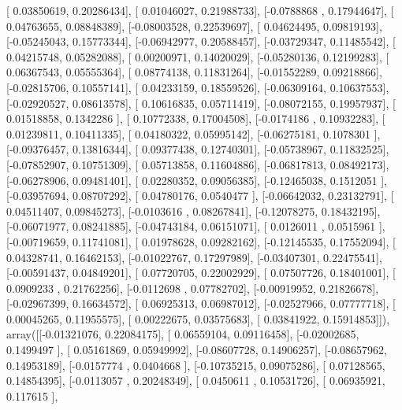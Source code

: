 \documentclass{article}
\begin{document}
       [ 0.03850619,  0.20286434],
       [ 0.01046027,  0.21988733],
       [-0.0788868 ,  0.17944647],
       [ 0.04763655,  0.08848389],
       [-0.08003528,  0.22539697],
       [ 0.04624495,  0.09819193],
       [-0.05245043,  0.15773344],
       [-0.06942977,  0.20588457],
       [-0.03729347,  0.11485542],
       [ 0.04215748,  0.05282088],
       [ 0.00200971,  0.14020029],
       [-0.05280136,  0.12199283],
       [ 0.06367543,  0.05555364],
       [ 0.08774138,  0.11831264],
       [-0.01552289,  0.09218866],
       [-0.02815706,  0.10557141],
       [ 0.04233159,  0.18559526],
       [-0.06309164,  0.10637553],
       [-0.02920527,  0.08613578],
       [ 0.10616835,  0.05711419],
       [-0.08072155,  0.19957937],
       [ 0.01518858,  0.1342286 ],
       [ 0.10772338,  0.17004508],
       [-0.0174186 ,  0.10932283],
       [ 0.01239811,  0.10411335],
       [ 0.04180322,  0.05995142],
       [-0.06275181,  0.1078301 ],
       [-0.09376457,  0.13816344],
       [ 0.09377438,  0.12740301],
       [-0.05738967,  0.11832525],
       [-0.07852907,  0.10751309],
       [ 0.05713858,  0.11604886],
       [-0.06817813,  0.08492173],
       [-0.06278906,  0.09481401],
       [ 0.02280352,  0.09056385],
       [-0.12465038,  0.1512051 ],
       [-0.03957694,  0.08707292],
       [ 0.04780176,  0.0540477 ],
       [-0.06642032,  0.23132791],
       [ 0.04511407,  0.09845273],
       [-0.0103616 ,  0.08267841],
       [-0.12078275,  0.18432195],
       [-0.06071977,  0.08241885],
       [-0.04743184,  0.06151071],
       [ 0.0126011 ,  0.0515961 ],
       [-0.00719659,  0.11741081],
       [ 0.01978628,  0.09282162],
       [-0.12145535,  0.17552094],
       [ 0.04328741,  0.16462153],
       [-0.01022767,  0.17297989],
       [-0.03407301,  0.22475541],
       [-0.00591437,  0.04849201],
       [ 0.07720705,  0.22002929],
       [ 0.07507726,  0.18401001],
       [ 0.0909233 ,  0.21762256],
       [-0.0112698 ,  0.07782702],
       [-0.00919952,  0.21826678],
       [-0.02967399,  0.16634572],
       [ 0.06925313,  0.06987012],
       [-0.02527966,  0.07777718],
       [ 0.00045265,  0.11955575],
       [ 0.00222675,  0.03575683],
       [ 0.03841922,  0.15914853]]), array([[-0.01321076,  0.22084175],
       [ 0.06559104,  0.09116458],
       [-0.02002685,  0.1499497 ],
       [ 0.05161869,  0.05949992],
       [-0.08607728,  0.14906257],
       [-0.08657962,  0.14953189],
       [-0.0157774 ,  0.0404668 ],
       [-0.10735215,  0.09075286],
       [ 0.07128565,  0.14854395],
       [-0.0113057 ,  0.20248349],
       [ 0.0450611 ,  0.10531726],
       [ 0.06935921,  0.117615  ],
\end{document}

